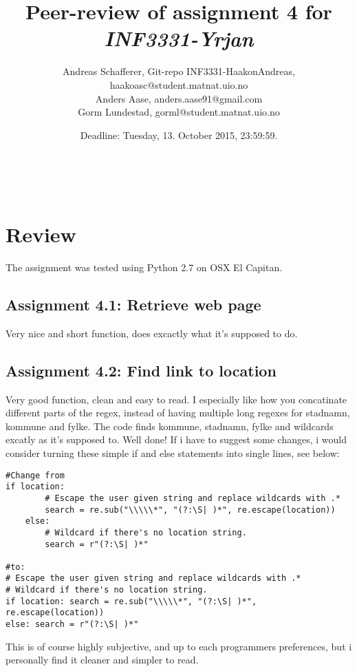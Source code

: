 \documentclass[a4paper]{article}
\title{Peer-review of assignment 4 for \textit{INF3331-Yrjan}}
\author{Andreas Schafferer, Git-repo INF3331-HaakonAndreas, {haakoasc@student.matnat.uio.no} \\
 		Anders Aase, {anders.aase91@gmail.com} \\
		Gorm Lundestad, {gorml@student.matnat.uio.no }}
\date{Deadline: Tuesday, 13. October 2015, 23:59:59.}
\begin{document}
\maketitle



\

\section{Review}\label{sec:review}

The assignment was tested using Python 2.7 on OSX El Capitan.

\subsection*{Assignment 4.1: Retrieve web page}
Very nice and short function, does excactly what it's supposed to do.


\subsection*{Assignment 4.2: Find link to location}
Very good function, clean and easy to read. I especially like how you concatinate different parts of the regex, instead of having multiple long regexes for stadnamn, kommune and fylke. \newline\newline
The code finds kommune, stadnamn, fylke and wildcards excatly as it's supposed to. Well done!\newline\newline
If i have to suggest some changes, i would consider turning these simple if and else statements into single lines, see below:

\begin{verbatim}
#Change from
if location:
        # Escape the user given string and replace wildcards with .*
        search = re.sub("\\\\\*", "(?:\S| )*", re.escape(location))
    else:
        # Wildcard if there's no location string.
        search = r"(?:\S| )*"

#to:
# Escape the user given string and replace wildcards with .*
# Wildcard if there's no location string.
if location: search = re.sub("\\\\\*", "(?:\S| )*", re.escape(location))
else: search = r"(?:\S| )*" 
\end{verbatim}
\newline
This is of course highly subjective, and up to each programmers preferences, but i personally find it cleaner and simpler to read.
\end{document}
